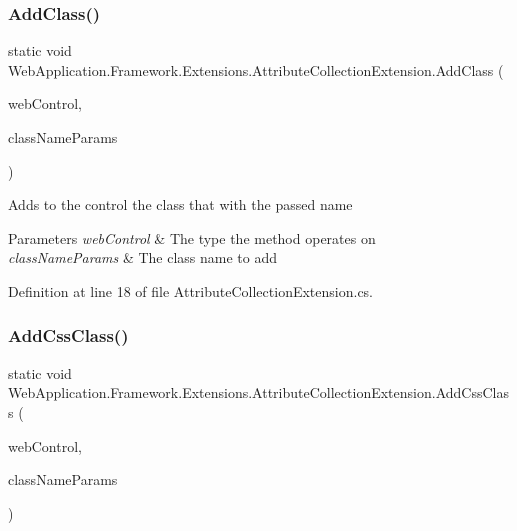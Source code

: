 \subsubsection{\texorpdfstring{AddClass()}{AddClass()}}
{\footnotesize\ttfamily static void Web\+Application.\+Framework.\+Extensions.\+Attribute\+Collection\+Extension.\+Add\+Class (\begin{DoxyParamCaption}\item[{this Web\+Control}]{web\+Control,  }\item[{params string \mbox{[}$\,$\mbox{]}}]{class\+Name\+Params }\end{DoxyParamCaption})\hspace{0.3cm}{\ttfamily [static]}}



Adds to the control the class that with the passed name 


\begin{DoxyParams}{Parameters}
{\em web\+Control} & The type the method operates on\\
\hline
{\em class\+Name\+Params} & The class name to add\\
\hline
\end{DoxyParams}


Definition at line 18 of file Attribute\+Collection\+Extension.\+cs.

\mbox{\label{classWebApplication_1_1Framework_1_1Extensions_1_1AttributeCollectionExtension_a84b3934d3bbed2605e8ded47f753978e}} 
\subsubsection{\texorpdfstring{AddCssClass()}{AddCssClass()}}
{\footnotesize\ttfamily static void Web\+Application.\+Framework.\+Extensions.\+Attribute\+Collection\+Extension.\+Add\+Css\+Class (\begin{DoxyParamCaption}\item[{this Web\+Control}]{web\+Control,  }\item[{params string \mbox{[}$\,$\mbox{]}}]{class\+Name\+Params }\end{DoxyParamCaption})\hspace{0.3cm}{\ttfamily [static]}}



